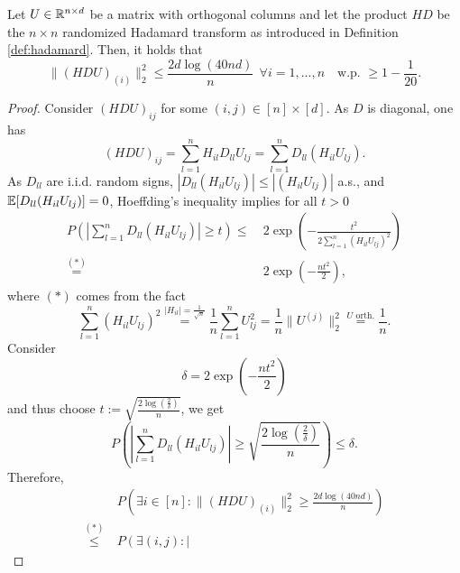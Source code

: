 \begin{lemma}
Let $U\in \mathbb{R}^{n \times d}$ be a matrix with orthogonal columns and let the product $HD$ be the $n\times n$ randomized Hadamard transform as introduced in Definition \ref{def:hadamard}. Then, it holds that
\begin{equation*}
\|(HDU)_{(i)}\|_2^2 \leq \frac{2d\log(40nd)}{n}\ \ \forall i=1,...,n		\quad \text{w.p. } \geq 1-\frac{1}{20}.
\end{equation*}
\begin{proof}
Consider $(HDU)_{ij}$ for some $(i,j)\in [n]\times [d]$. As $D$ is diagonal, one has
\begin{equation*}
(HDU)_{ij} = \sum_{l=1}^n H_{il}D_{ll}U_{lj} = \sum_{l=1}^n D_{ll}(H_{il}U_{lj}).
\end{equation*}
As $D_{ll}$ are i.i.d. random signs, $|D_{ll}(H_{il}U_{lj})|\leq |(H_{il}U_{lj})|$ a.s., and $\mathbb{E}[D_{ll}(H_{il}U_{lj})] = 0$, Hoeffding's inequality implies for all $t>0$
\begin{equation*}
\begin{split}
P\left( \left|
\sum_{l=1}^n D_{ll}(H_{il}U_{lj})
\right| \geq t \right)  
\leq & \ 2 \exp \left( -
\frac{t^2}{2\sum_{l=1}^n(H_{il}U_{lj})^2}
\right)\\
\overset{(*)}{=} & \  2 \exp \left( 
- \frac{nt^2}{2}
\right),
\end{split}
\end{equation*}
where $(*)$ comes from the fact
\begin{equation*}
\sum_{l=1}^n (H_{il}U_{lj})^2 \overset{|H_{il}|=\frac{1}{\sqrt{n}}}{=} \frac{1}{n}\sum_{l=1}^n U_{lj}^2 = \frac{1}{n}\|U^{(j)}\|_2^2 \overset{U \text{ orth.}}{=} \frac{1}{n}.
\end{equation*}
Consider 
\begin{equation*}
\delta = 2 \exp \left( 
- \frac{nt^2}{2}
\right)
\end{equation*}
and thus choose $t:= \sqrt{\frac{2\log\left(\frac{2}{\delta}\right)}{n}}$,
we get
\begin{equation}\label{eq:help}
P\left( \left|
\sum_{l=1}^n D_{ll}(H_{il}U_{lj})
\right| \geq \sqrt{\frac{2\log\left(\frac{2}{\delta}\right)}{n}} \right)  
\leq \delta.
\end{equation}
Therefore,
\begin{equation*}
\begin{split}
& P\left(
\exists i \in [n]: \|(HDU)_{(i)}\|_2^2 \geq \frac{2d\log(40nd)}{n}
\right) \\
\overset{(*)}{\leq} \ & P \left(
\exists (i,j): \left|

\end{split}
\end{equation*}
\end{proof}
\end{lemma}

